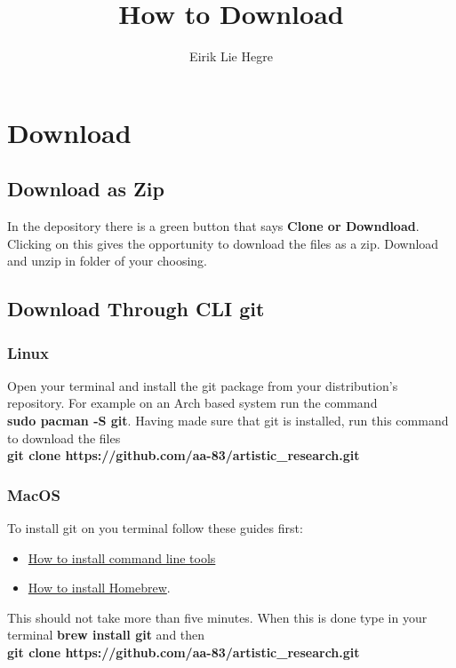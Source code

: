 \documentclass[12pt, letterpaper]{article}
\title{How to Download}
\author{Eirik Lie Hegre}
\begin{document}
\maketitle


\tableofcontents

\section{Download}
\subsection{Download as Zip}
In the depository there is a green button that says \textbf{Clone or Downdload}.
Clicking on this gives the opportunity to download the files as a zip.
Download and unzip in folder of your choosing.

\subsection{Download Through CLI git}

\subsubsection{Linux}
Open your terminal and install the git package from your distribution's
repository. For example on an Arch based system run the command \hfill \\
\textbf{sudo pacman -S git}.
Having made sure that git is installed, run this command to
download the files \hfill \\
\textbf{git clone https://github.com/aa-83/artistic\_research.git}

\subsubsection{MacOS}
To install git on you terminal follow these guides first:
\begin{itemize}
	\item \href{http://osxdaily.com/2014/02/12/install-command-line-tools-mac-os-x/}{How to install command line tools}
	\item \href{http://osxdaily.com/2018/03/07/how-install-homebrew-mac-os/}{How to install Homebrew}.
\end{itemize}
This should not take more than five minutes. When this is done type in your
terminal \textbf{brew install git} and then \hfill \\
\textbf{git clone https://github.com/aa-83/artistic\_research.git}
\end{document}
